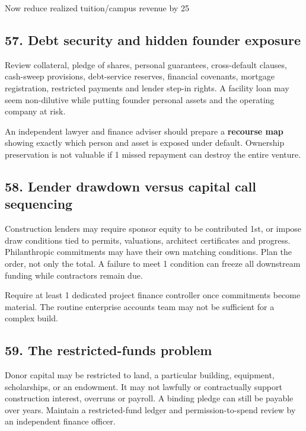 Now reduce realized tuition/campus revenue by 25%


\subsection{57. Debt security and hidden founder exposure}

Review collateral, pledge of shares, personal guarantees, cross-default clauses, cash-sweep provisions, debt-service reserves, financial covenants, mortgage registration, restricted payments and lender step-in rights. A facility loan may seem non-dilutive while putting founder personal assets and the operating company at risk.

An independent lawyer and finance adviser should prepare a \textbf{recourse map} showing exactly which person and asset is exposed under default. Ownership preservation is not valuable if 1 missed repayment can destroy the entire venture.


\subsection{58. Lender drawdown versus capital call sequencing}

Construction lenders may require sponsor equity to be contributed 1st, or impose draw conditions tied to permits, valuations, architect certificates and progress. Philanthropic commitments may have their own matching conditions. Plan the order, not only the total. A failure to meet 1 condition can freeze all downstream funding while contractors remain due.

Require at least 1 dedicated project finance controller once commitments become material. The routine enterprise accounts team may not be sufficient for a complex build.


\subsection{59. The restricted-funds problem}

Donor capital may be restricted to land, a particular building, equipment, scholarships, or an endowment. It may not lawfully or contractually support construction interest, overruns or payroll. A binding pledge can still be payable over years. Maintain a restricted-fund ledger and permission-to-spend review by an independent finance officer.


